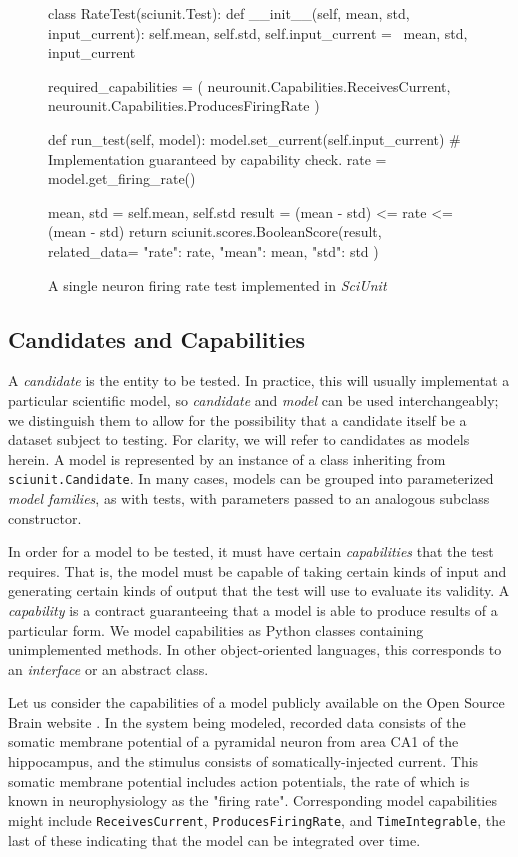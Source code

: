 \documentclass[11pt,letterpaper]{article}
\begin{document}
\begin{figure}
\caption{A single neuron firing rate test implemented in \textit{SciUnit}}
\label{fig:rate_test}
\begin{python}
class RateTest(sciunit.Test):
	def __init__(self, mean, std, input_current):
		self.mean, self.std, self.input_current = \
		mean, std, input_current
	
	required_capabilities = (
		neurounit.Capabilities.ReceivesCurrent,
		neurounit.Capabilities.ProducesFiringRate
	)
	
	def run_test(self, model):
		model.set_current(self.input_current) 
		# Implementation guaranteed by capability check.  
		rate = model.get_firing_rate()
		
		mean, std = self.mean, self.std
		result = (mean - std) <= rate <= (mean - std)
		return sciunit.scores.BooleanScore(result, related_data={
			"rate": rate,
			"mean": mean,
			"std": std
		})
\end{python}
\vspace{-18px}
\end{figure}

\subsection{Candidates and Capabilities}
A \textit{candidate} is the entity to be tested.  In practice, this will usually implementat a particular scientific model, so \textit{candidate} and \textit{model} can be used interchangeably; we distinguish them to allow for the possibility that a candidate itself be a dataset subject to testing.  For clarity, we will refer to candidates as models herein.  A model is represented by an instance of a class inheriting from \verb|sciunit.Candidate|.  In many cases, models can be grouped into parameterized \textit{model families}, as with tests, with parameters passed to an analogous subclass constructor.

In order for a model to be tested, it must have certain \textit{capabilities} that the test requires.  That is, the model must be capable of taking certain kinds of input and generating certain kinds of output that the test will use to evaluate its validity.  A \textit{capability} is a contract guaranteeing that a model is able to produce results of a particular form. We model capabilities as Python classes containing unimplemented methods. In other object-oriented languages, this corresponds to an \textit{interface} or an abstract class.  

Let us consider the capabilities of a model publicly available on the Open Source Brain website \cite{osb_ca1_url}.  In the system being modeled, recorded data consists of the somatic membrane potential of a pyramidal neuron from area CA1 of the hippocampus, and the stimulus consists of somatically-injected current.  This somatic membrane potential includes action potentials, the rate of which is known in neurophysiology as the "firing rate".  Corresponding model capabilities might include \verb|ReceivesCurrent|, \verb|ProducesFiringRate|, and \verb|TimeIntegrable|, the last of these indicating that the model can be integrated over time.    
\end{document}
